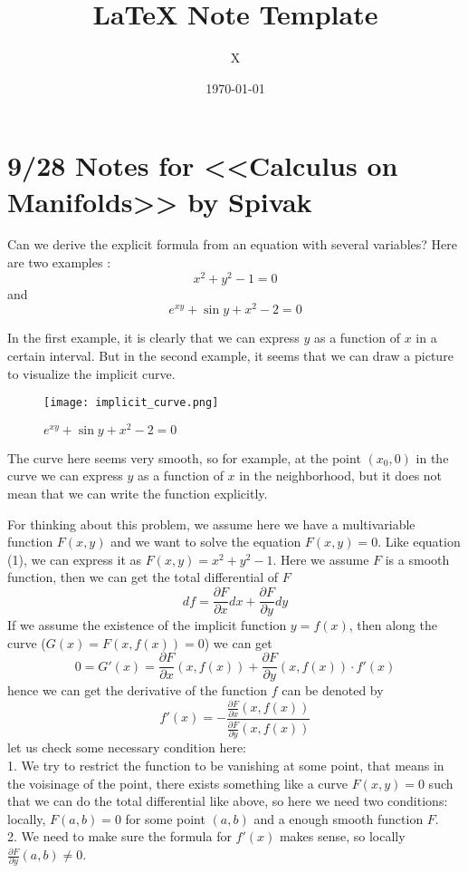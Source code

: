 \documentclass[12pt,a4paper]{article}
\title{\LaTeX{} Note Template}
\author{X}
\date{\today}
\begin{document}
{}
\tableofcontents
\newpage 

\section{9/28 Notes for <<Calculus on Manifolds>> by Spivak}

\begin{problem*}
    Can we derive the explicit formula from an equation with several variables?
    Here are two examples :\\
    \begin{equation}
        x^2 + y^2 -1 =0
    \end{equation}
    and \begin{equation}
        e^{xy   } + \sin y + x^2 -2 =0
    \end{equation}
\end{problem*}

In the first example, it is clearly that we can express $y$ as a function of $x$ in a certain interval. But in the second example, it seems that we can draw a picture to visualize the implicit curve.

\begin{figure}[H]
    \centering
    \texttt{[image: implicit\_curve.png]}
    \caption{$e^{xy} + \sin y + x^2 - 2 = 0$}
    \label{fig:implicit_curve}
\end{figure}

The curve here seems very smooth, so for example, at the point \((x_0,0)\) in the curve we can express \(y\) as a function of \(x\) in the neighborhood, but it does not mean that we can write the function explicitly.

For thinking about this problem, we assume here we have a multivariable function \(F(x,y)\) and we want to solve the equation \(F(x,y)=0\). Like equation (1), we can express it as \(F(x,y) = x^2+y^2-1\). Here we assume \(F\) is a smooth function, then we can get the total differential of \(F\)
\[df = \frac{\partial F}{\partial x}dx + \frac{\partial F}{\partial y}dy\]
If we assume the existence of the implicit function \(y=f(x)\), then along the curve (\(G(x) = F(x,f(x)) = 0\)) we can get
\[0 = G'(x) =  \frac{\partial F}{\partial x}(x,f(x)) + \frac{\partial F}{\partial y}(x,f(x))\cdot f'(x) \]
hence we can get the derivative of the function \(f\) can be denoted by
\[f'(x) = -\frac{\frac{\partial F}{\partial x}(x,f(x))}{\frac{\partial F}{\partial y}(x,f(x))}\]
let us check some necessary condition here:\\
1. We try to restrict the function to be vanishing at some point, that means in the voisinage of the point, there exists something like a curve \(F(x,y)=0\) such that we can do the total differential like above, so here we need two conditions: locally, \(F(a,b) = 0\) for some point \((a,b)\) and a enough smooth function \(F\).\\
2. We need to make sure the formula for \(f'(x)\) makes sense, so locally \(\frac{\partial F}{\partial y}(a,b) \neq 0\).\\
\end{document}
